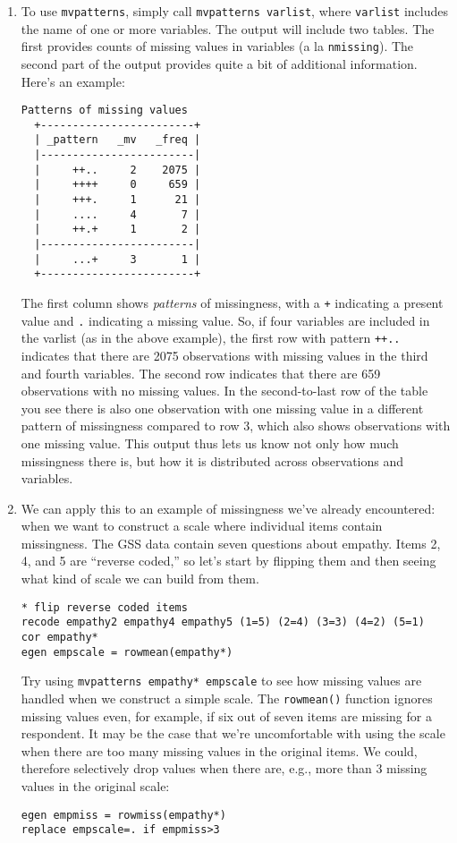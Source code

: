 \documentclass[a4paper,12pt]{article}
\begin{document}
\begin{enumerate}
\item To use \texttt{mvpatterns}, simply call \texttt{mvpatterns varlist}, where \texttt{varlist} includes the name of one or more variables. The output will include two tables. The first provides counts of missing values in variables (a la \texttt{nmissing}). The second part of the output provides quite a bit of additional information. Here's an example:
\begin{verbatim}
Patterns of missing values
  +------------------------+
  | _pattern   _mv   _freq |
  |------------------------|
  |     ++..     2    2075 |
  |     ++++     0     659 |
  |     +++.     1      21 |
  |     ....     4       7 |
  |     ++.+     1       2 |
  |------------------------|
  |     ...+     3       1 |
  +------------------------+
\end{verbatim}

The first column shows {\em patterns} of missingness, with a \texttt{+} indicating a present value and \texttt{.} indicating a missing value. So, if four variables are included in the varlist (as in the above example), the first row with pattern \texttt{++..} indicates that there are 2075 observations with missing values in the third and fourth variables. The second row indicates that there are 659 observations with no missing values. In the second-to-last row of the table you see there is also one observation with one missing value in a different pattern of missingness compared to row 3, which also shows observations with one missing value. This output thus lets us know not only how much missingness there is, but how it is distributed across observations and variables.

\item We can apply this to an example of missingness we've already encountered: when we want to construct a scale where individual items contain missingness. The GSS data contain seven questions about empathy. Items 2, 4, and 5 are ``reverse coded,'' so let's start by flipping them and then seeing what kind of scale we can build from them.
\begin{verbatim}
* flip reverse coded items
recode empathy2 empathy4 empathy5 (1=5) (2=4) (3=3) (4=2) (5=1)
cor empathy*
egen empscale = rowmean(empathy*)
\end{verbatim}

Try using \texttt{mvpatterns empathy* empscale} to see how missing values are handled when we construct a simple scale. The \texttt{rowmean()} function ignores missing values even, for example, if six out of seven items are missing for a respondent. It may be the case that we're uncomfortable with using the scale when there are too many missing values in the original items. We could, therefore selectively drop values when there are, e.g., more than 3 missing values in the original scale:
\begin{verbatim}
egen empmiss = rowmiss(empathy*)
replace empscale=. if empmiss>3
\end{verbatim}



\end{enumerate}
\end{document}
